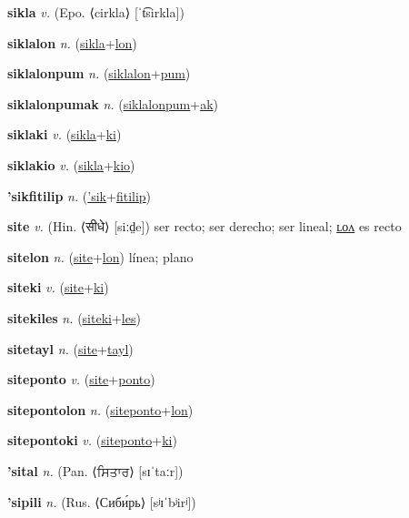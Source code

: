 \textbf{\hypertarget{sikla}{sikla}} \textit{v.} (Epo. ⟨cirkla⟩ [ˈt͡sirkla])


\textbf{\hypertarget{siklalon}{siklalon}} \textit{n.} (\hyperlink{sikla}{sikla}+\allowbreak \hyperlink{lon}{lon})


\textbf{\hypertarget{siklalonpum}{siklalonpum}} \textit{n.} (\hyperlink{siklalon}{siklalon}+\allowbreak \hyperlink{pum}{pum})


\textbf{\hypertarget{siklalonpumak}{siklalonpumak}} \textit{n.} (\hyperlink{siklalonpum}{siklalonpum}+\allowbreak \hyperlink{ak}{ak})


\textbf{\hypertarget{siklaki}{siklaki}} \textit{v.} (\hyperlink{sikla}{sikla}+\allowbreak \hyperlink{ki}{ki})


\textbf{\hypertarget{siklakio}{siklakio}} \textit{v.} (\hyperlink{sikla}{sikla}+\allowbreak \hyperlink{kio}{kio})


\textbf{\hypertarget{'sikfitilip}{'sikfitilip}} \textit{n.} (\hyperlink{'sik}{'sik}+\allowbreak \hyperlink{fitilip}{fitilip})


\textbf{\hypertarget{site}{site}} \textit{v.} (Hin. ⟨{\devanagari{}सीधे}⟩ [siːd̤e])
ser recto; ser derecho; ser lineal; \hyperlink{sitelon}{ʟᴏᴧ} es recto

\textbf{\hypertarget{sitelon}{sitelon}} \textit{n.} (\hyperlink{site}{site}+\allowbreak \hyperlink{lon}{lon})
línea; plano

\textbf{\hypertarget{siteki}{siteki}} \textit{v.} (\hyperlink{site}{site}+\allowbreak \hyperlink{ki}{ki})


\textbf{\hypertarget{sitekiles}{sitekiles}} \textit{n.} (\hyperlink{siteki}{siteki}+\allowbreak \hyperlink{les}{les})


\textbf{\hypertarget{sitetayl}{sitetayl}} \textit{n.} (\hyperlink{site}{site}+\allowbreak \hyperlink{tayl}{tayl})


\textbf{\hypertarget{siteponto}{siteponto}} \textit{v.} (\hyperlink{site}{site}+\allowbreak \hyperlink{ponto}{ponto})


\textbf{\hypertarget{sitepontolon}{sitepontolon}} \textit{n.} (\hyperlink{siteponto}{siteponto}+\allowbreak \hyperlink{lon}{lon})


\textbf{\hypertarget{sitepontoki}{sitepontoki}} \textit{v.} (\hyperlink{siteponto}{siteponto}+\allowbreak \hyperlink{ki}{ki})


\textbf{\hypertarget{'sital}{'sital}} \textit{n.} (Pan. ⟨{\gurmukhi{}ਸਿਤਾਰ}⟩ [sɪˈtaːr])


\textbf{\hypertarget{'sipili}{'sipili}} \textit{n.} (Rus. ⟨Сиби́рь⟩ [sʲɪˈbʲirʲ])


